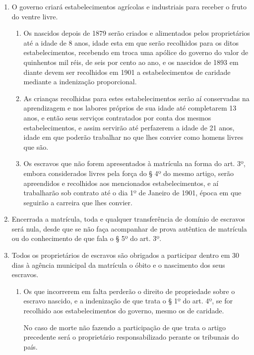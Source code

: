 \begin{enumerate}[label=Art. \arabic*º]
\item O governo criará estabelecimentos agrícolas e industriais para
receber o fruto do ventre livre.

\begin{enumerate}[label=§ \arabic*º]
\item Os nascidos depois de 1879 serão criados e alimentados pelos
proprietários até a idade de 8 anos, idade esta em que serão recolhidos
para os ditos estabelecimentos, recebendo em troca uma apólice do
governo do valor de quinhentos mil réis, de seis por cento ao ano, e os
nascidos de 1893 em diante devem ser recolhidos em 1901 a
estabelecimentos de caridade mediante a indenização proporcional.

\item As crianças recolhidas para estes estabelecimentos serão aí
conservadas na aprendizagem e nos labores próprios de sua idade até
completarem 13 anos, e então seus serviços contratados por conta dos
mesmos estabelecimentos, e assim servirão até perfazerem a idade de 21
anos, idade em que poderão trabalhar no que lhes convier como homens
livres que são.

\item Os escravos que não forem apresentados à matrícula na forma do
art. 3º, embora considerados livres pela força do § 4º do mesmo artigo,
serão apreendidos e recolhidos aos mencionados estabelecimentos, e aí
trabalharão sob contrato até o dia 1º de Janeiro de 1901, época em que
seguirão a carreira que lhes convier.
\end{enumerate}

\item Encerrada a matrícula, toda e qualquer transferência de domínio
de escravos será nula, desde que se não faça acompanhar de prova
autêntica de matrícula ou do conhecimento de que fala o § 5º do art.
3º.

\item Todos os proprietários de escravos são obrigados a participar
dentro em 30 dias à agência municipal da matrícula o óbito e o
nascimento dos seus escravos.

\begin{enumerate}[label=§ \arabic*º]
\item Os que incorrerem em falta perderão o direito de propriedade sobre
o escravo nascido, e a indenização de que trata o § 1º do art. 4º, se
for recolhido aos estabelecimentos do governo, mesmo os de caridade.

No caso de morte não fazendo a participação de que trata o artigo
precedente será o proprietário responsabilizado perante os tribunais do
país.


\end{enumerate}
\end{enumerate}
